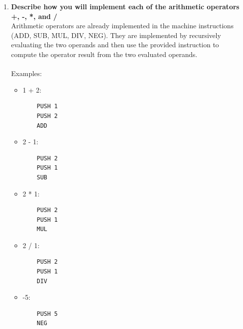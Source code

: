 \documentclass[11pt]{article}
\begin{document}
\begin{enumerate}[label=(\alph*)]
\item \textbf{Describe how you will implement each of the arithmetic operators +, -, *, and /}\\
    Arithmetic operators are already implemented in the machine
    instructions (ADD, SUB, MUL, DIV, NEG). They are implemented by
    recursively evaluating the two operands and then use the provided
    instruction to compute the operator result from the two evaluated
    operands.\\
\\
Examples:
\begin{itemize}
\item 1 + 2:
\begin{lstlisting}
    PUSH 1
    PUSH 2
    ADD
\end{lstlisting}
\item 2 - 1:
\begin{lstlisting}
    PUSH 2
    PUSH 1
    SUB
\end{lstlisting}
\item 2 * 1:
\begin{lstlisting}
    PUSH 2
    PUSH 1
    MUL
\end{lstlisting}
\item 2 / 1:
\begin{lstlisting}
    PUSH 2
    PUSH 1
    DIV
\end{lstlisting}
\item -5:
\begin{lstlisting}
    PUSH 5
    NEG
\end{lstlisting}
\end{itemize}


\end{enumerate}
\end{document}
